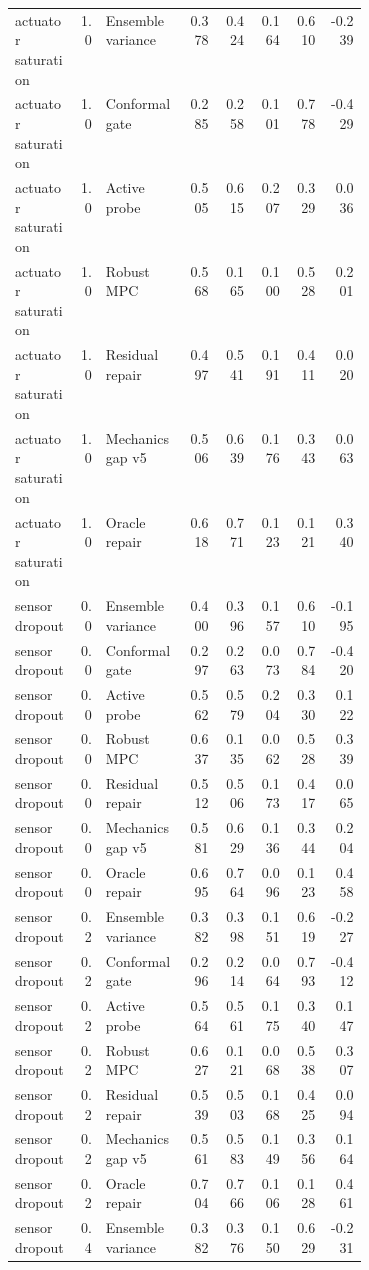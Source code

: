 \documentclass{article}
\begin{document}
\begin{center}
\begin{longtable}{p{0.18\linewidth}rp{0.23\linewidth}rrrrr}
actuator saturation & 1.0 & Ensemble variance & 0.378 & 0.424 & 0.164 & 0.610 & -0.239\\
actuator saturation & 1.0 & Conformal gate & 0.285 & 0.258 & 0.101 & 0.778 & -0.429\\
actuator saturation & 1.0 & Active probe & 0.505 & 0.615 & 0.207 & 0.329 & 0.036\\
actuator saturation & 1.0 & Robust MPC & 0.568 & 0.165 & 0.100 & 0.528 & 0.201\\
actuator saturation & 1.0 & Residual repair & 0.497 & 0.541 & 0.191 & 0.411 & 0.020\\
actuator saturation & 1.0 & Mechanics gap v5 & 0.506 & 0.639 & 0.176 & 0.343 & 0.063\\
actuator saturation & 1.0 & Oracle repair & 0.618 & 0.771 & 0.123 & 0.121 & 0.340\\
sensor dropout & 0.0 & Ensemble variance & 0.400 & 0.396 & 0.157 & 0.610 & -0.195\\
sensor dropout & 0.0 & Conformal gate & 0.297 & 0.263 & 0.073 & 0.784 & -0.420\\
sensor dropout & 0.0 & Active probe & 0.562 & 0.579 & 0.204 & 0.330 & 0.122\\
sensor dropout & 0.0 & Robust MPC & 0.637 & 0.135 & 0.062 & 0.528 & 0.339\\
sensor dropout & 0.0 & Residual repair & 0.512 & 0.506 & 0.173 & 0.417 & 0.065\\
sensor dropout & 0.0 & Mechanics gap v5 & 0.581 & 0.629 & 0.136 & 0.344 & 0.204\\
sensor dropout & 0.0 & Oracle repair & 0.695 & 0.764 & 0.096 & 0.123 & 0.458\\
sensor dropout & 0.2 & Ensemble variance & 0.382 & 0.398 & 0.151 & 0.619 & -0.227\\
sensor dropout & 0.2 & Conformal gate & 0.296 & 0.214 & 0.064 & 0.793 & -0.412\\
sensor dropout & 0.2 & Active probe & 0.564 & 0.561 & 0.175 & 0.340 & 0.147\\
sensor dropout & 0.2 & Robust MPC & 0.627 & 0.121 & 0.068 & 0.538 & 0.307\\
sensor dropout & 0.2 & Residual repair & 0.539 & 0.503 & 0.168 & 0.425 & 0.094\\
sensor dropout & 0.2 & Mechanics gap v5 & 0.561 & 0.583 & 0.149 & 0.356 & 0.164\\
sensor dropout & 0.2 & Oracle repair & 0.704 & 0.766 & 0.106 & 0.128 & 0.461\\
sensor dropout & 0.4 & Ensemble variance & 0.382 & 0.376 & 0.150 & 0.629 & -0.231\\

\end{longtable}
\end{center}
\end{document}
